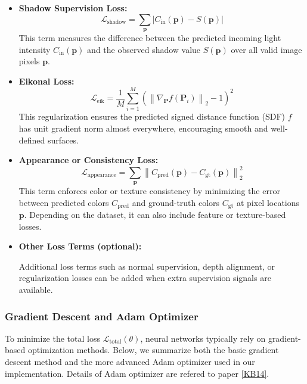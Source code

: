 \documentclass[12pt]{article}
\theoremstyle{definition}
\begin{document}
\begin{itemize}
    \item \textbf{Shadow Supervision Loss:}
    \begin{equation}
    \mathcal{L}_{\text{shadow}} = \sum_{\mathbf{p}} \left| C_{\mathrm{in}}(\mathbf{p}) - S(\mathbf{p}) \right|
    \end{equation}
    This term measures the difference between the predicted incoming light intensity $C_{\mathrm{in}}(\mathbf{p})$ and the observed shadow value $S(\mathbf{p})$ over all valid image pixels $\mathbf{p}$.

    \item \textbf{Eikonal Loss:}
    \begin{equation}
    \mathcal{L}_{\text{eik}} = \frac{1}{M} \sum_{i=1}^M \left( \left\| \nabla_\mathbf{P} f(\mathbf{P}_i) \right\|_2 - 1 \right)^2
    \end{equation}
    This regularization ensures the predicted signed distance function (SDF) $f$ has unit gradient norm almost everywhere, encouraging smooth and well-defined surfaces.

    \item \textbf{Appearance or Consistency Loss:}
    \begin{equation}
    \mathcal{L}_{\text{appearance}} = \sum_{\mathbf{p}} \left\| C_{\text{pred}}(\mathbf{p}) - C_{\text{gt}}(\mathbf{p}) \right\|_2^2
    \end{equation}
    This term enforces color or texture consistency by minimizing the error between predicted colors $C_{\text{pred}}$ and ground-truth colors $C_{\text{gt}}$ at pixel locations $\mathbf{p}$. Depending on the dataset, it can also include feature or texture-based losses.

    \item \textbf{Other Loss Terms (optional):}
    
    Additional loss terms such as normal supervision, depth alignment, or regularization losses can be added when extra supervision signals are available.
\end{itemize}

\newpage

\subsubsection{Gradient Descent and Adam Optimizer} \label{sec:adam_optimizer}

To minimize the total loss $\mathcal{L}_{\text{total}}(\theta)$, neural networks typically rely on gradient-based optimization methods. Below, we summarize both the basic gradient descent method and the more advanced Adam optimizer used in our implementation. Details of Adam optimizer are refered to paper \hyperlink{[KB14]}{[KB14]}.
\end{document}
